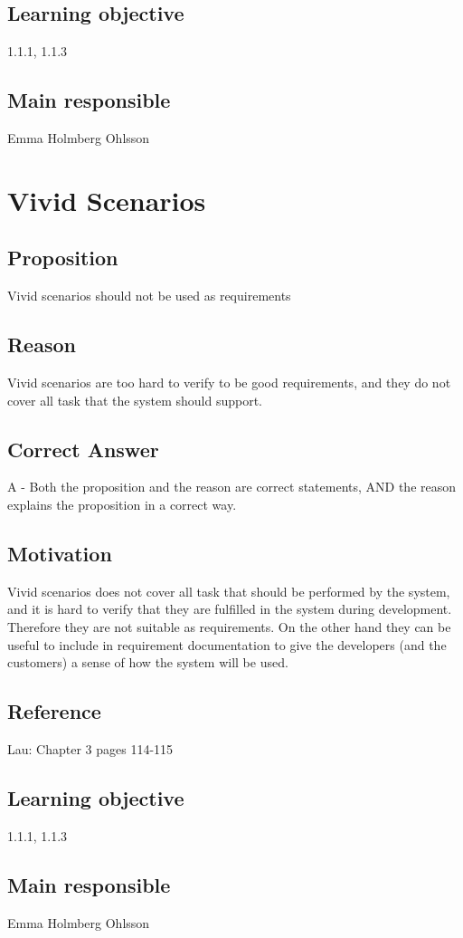 \documentclass[a4paper]{article}
\begin{document}
\subsection*{Learning objective}
1.1.1, 1.1.3
\subsection*{Main responsible}
Emma Holmberg Ohlsson


\section{Vivid Scenarios}
\subsection*{Proposition}
Vivid scenarios should not be used as requirements
\subsection*{Reason}
Vivid scenarios are too hard to verify to be good requirements, and they do not cover all task that the system should support.
\subsection*{Correct Answer}
A - Both the proposition and the reason are correct statements, AND the reason explains the proposition in a correct way.
\subsection*{Motivation}
Vivid scenarios does not cover all task that should be performed by the system, and it is hard to verify that they are fulfilled in the system during development. Therefore they are not suitable as requirements. On the other hand they can be useful to include in requirement documentation to give the developers (and the customers) a sense of how the system will be used.
\subsection*{Reference}
Lau: Chapter 3 pages 114-115
\subsection*{Learning objective}
1.1.1, 1.1.3
\subsection*{Main responsible}
Emma Holmberg Ohlsson
\end{document}
